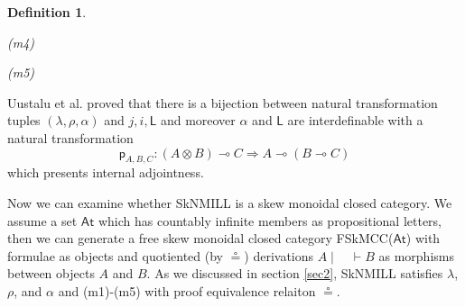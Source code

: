\documentclass[submission,copyright,creativecommons]{eptcs}
\newtheorem{defn}[theorem]{Definition}
\newcommand{\ot}{\otimes}
\newcommand{\lolli}{\multimap}
\newcommand{\I}{\mathsf{I}}
\newcommand{\msfL}{\mathsf{L}}
\begin{document}
\begin{defn}
\begin{center}
(m4)

(m5)
\end{center}
\end{defn}
Uustalu et al. \cite{uustalu:eilenberg-kelly:2020} proved that there is a bijection between natural transformation tuples $(\lambda , \rho , \alpha)$ and $j , i , \msfL$ and moreover $\alpha$ and $\msfL$ are interdefinable with a natural transformation
\begin{displaymath}
  \mathsf{p}_{A , B , C} : (A \ot B) \lolli C \Longrightarrow A \lolli (B \lolli C)
\end{displaymath}
which presents internal adjointness.

Now we can examine whether SkNMILL is a skew monoidal closed category.
We assume a set $\mathsf{At}$ which has countably infinite members as propositional letters, then we can generate a free skew monoidal closed category FSkMCC($\mathsf{At}$) with formulae as objects and quotiented (by $\circeq$) derivations $A \mid \quad \vdash B$ as morphisms between objects $A$ and $B$.
As we discussed in section \ref{sec2}, SkNMILL satisfies $\lambda$, $\rho$, and $\alpha$ and (m1)-(m5) with proof equivalence relaiton $\circeq$.
\end{document}
